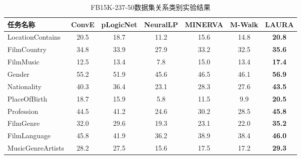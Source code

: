 \documentclass[algorithmlist, AutoFakeBold, AutoFakeSlant, figurelist, tablelist, nomlist, engineering]{seuthesix}
\begin{document}
\begin{table}[]
  \centering
  \begin{tabular*}{1\textwidth}{@{\extracolsep{\fill}}lcccccc}
  \toprule[1pt]
  任务名称 & ConvE & pLogicNet & NeuralLP & MINERVA & M-Walk & LAURA \\ \hline
  LocationContains & 20.5 & 18.7 & 11.2 & 15.6 & 14.8 & \textbf{20.8} \\
  FilmCountry & 34.8 & 33.9 & 27.9 & 33.2 & 32.5 & \textbf{35.6} \\
  FilmMusic & 12.5 & 13.4 & 7.8 & 15.0 & 13.4 & \textbf{17.4} \\
  Gender & 55.2 & 51.9 & 45.6 & 46.5 & 46.1 & \textbf{56.9} \\
  Nationality & 40.3 & 36.4 & 23.1 & 28.3 & 27.6 & \textbf{43.5} \\
  PlaceOfBirth & 18.7 & 15.9 & 5.8 & 11.5 & 9.9 & \textbf{20.5} \\
  Profession & 44.5 & 41.2 & 24.6 & 30.2 & 28.5 & \textbf{45.8} \\
  FilmGenre & 32.0 & 29.6 & 19.3 & 23.1 & 22.0 & \textbf{35.2} \\
  FilmLanguage & 45.8 & 41.9 & 36.2 & 38.9 & 38.4 & \textbf{46.0} \\
  MusicGenreArtists & 28.2 & 27.5 & 15.6 & 17.5 & 17.2 & \textbf{29.3} \\
  \bottomrule[1pt]
  \end{tabular*}
  \caption{FB15K-237-50数据集关系类别实验结果}
  \label{Experiment2_tasks}
\end{table}
\end{document}
